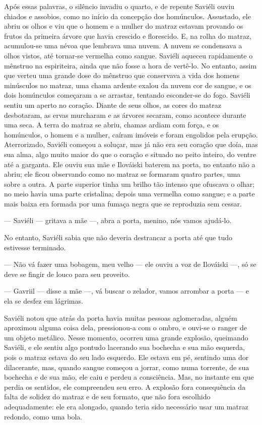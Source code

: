 Após essas palavras, o silêncio invadiu o quarto, e de repente Saviéli
ouviu chiados e assobios, como no início da concepção dos homúnculos.
Assustado, ele abriu os olhos e viu que o homem e a mulher do matraz
estavam provando os frutos da primeira árvore que havia crescido e
florescido. E, na rolha do matraz, acumulou-se uma névoa que lembrava
uma nuvem. A nuvem se condensava a olhos vistos, até tornar-se vermelha
como sangue. Saviéli aqueceu rapidamente o mênstruo na espiriteira,
ainda que não fosse a hora de vertê-lo. No entanto, assim que verteu uma
grande dose do mênstruo que conservava a vida dos homens minúsculos no
matraz, uma chama ardente exalou da nuvem cor de sangue, e os dois
homúnculos começaram a se arrastar, tentando esconder-se do fogo.
Saviéli sentiu um aperto no coração. Diante de seus olhos, as cores do
matraz desbotaram, as ervas murcharam e as árvores secaram, como
acontece durante uma seca. A terra do matraz se abriu, chamas ardiam com
força, e os homúnculos, o homem e a mulher, caíram imóveis e foram
engolidos pela erupção. Aterrorizado, Saviéli começou a soluçar, mas já
não era seu coração que doía, mas sua alma, algo muito maior do que o
coração e situado no peito inteiro, do ventre até a garganta. Ele ouviu
sua mãe e Ilováiski baterem na porta, no entanto não a abriu; ele ficou
observando como no matraz se formaram quatro partes, uma sobre a outra.
A parte superior tinha um brilho tão intenso que ofuscava o olhar; no
meio havia uma parte cristalina; depois uma vermelha como sangue; e a
parte mais baixa era formada por uma fumaça negra que se reproduzia sem
cessar.

--- Saviéli --- gritava a mãe ---, abra a porta, menino, nós vamos
ajudá-lo.

No entanto, Saviéli sabia que não deveria destrancar a porta até que
tudo estivesse terminado.

--- Não vá fazer uma bobagem, meu velho --- ele ouviu a voz de Ilováiski
---, só se deve se fingir de louco para seu proveito.

--- Gavriil --- disse a mãe ---, vá buscar o zelador, vamos arrombar a
porta --- e ela se desfez em lágrimas.

Saviéli notou que atrás da porta havia muitas pessoas aglomeradas,
alguém aproximou alguma coisa dela, pressionou-a com o ombro, e ouvi-se
o ranger de um objeto metálico. Nesse momento, ocorreu uma grande
explosão, queimando Saviéli, e ele sentiu algo pontudo lacerando sua
bochecha e sua mão esquerda, pois o matraz estava do seu lado esquerdo.
Ele estava em pé, sentindo uma dor dilacerante, mas, quando sangue
começou a jorrar, como numa torrente, de sua bochecha e de sua mão, ele
caiu e perdeu a consciência. Mas, no instante em que perdia os sentidos,
ele compreendeu seu erro. A explosão fora consequência da falta de
solidez do matraz e de seu formato, que não fora escolhido
adequadamente: ele era alongado, quando teria sido necessário usar um
matraz redondo, como uma bola.

